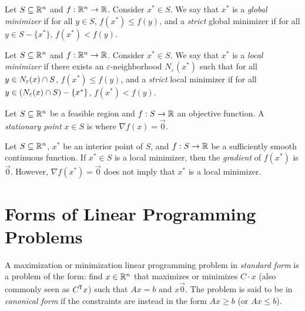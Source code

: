\begin{defn}
    Let $S \subseteq \mathbb{R}^n$ and $f: \mathbb{R}^n \to \mathbb{R}$. Consider $x^* \in S$. We say that $x^*$ is a \emph{global minimizer} if for all $y \in S$, $f(x^*) \leq f(y)$, and a \emph{strict} global minimizer if for all $y \in S - \{x^*\}$, $f(x^*) < f(y)$.
\end{defn}

\begin{defn}
    Let $S \subseteq \mathbb{R}^n$ and $f: \mathbb{R}^n \to \mathbb{R}$. Consider $x^* \in S$. We say that $x^*$ is a \emph{local minimizer} if there exists an $\varepsilon$-neighborhood $N_{\varepsilon}(x^*)$ such that for all $y \in N_{\varepsilon}(x) \cap S$, $f(x^*) \leq f(y)$, and a \emph{strict} local minimizer if for all $y \in \left(N_{\varepsilon}(x) \cap S\right) - \{x^*\}$, $f(x^*) < f(y)$.
\end{defn}

\begin{defn}
    Let $S \subseteq \mathbb{R}^n$ be a feasible region and $f: S \to \mathbb{R}$ an objective function. A \emph{stationary point} $x \in S$ is where $\nabla f(x) = \vec{0}.$
\end{defn}

\begin{rmk}
    Let $S \subseteq \mathbb{R}^n$, $x^*$ be an interior point of $S$, and $f: S \to \mathbb{R}$ be a sufficiently smooth continuous function. If $x^* \in S$ is a local minimizer, then the \emph{gradient} of $f(x^*)$ is $\vec{0}$. However, $\nabla f(x^*) = \vec{0}$ does not imply that $x^*$ is a local minimizer.
\end{rmk}

\section{Forms of Linear Programming Problems}

\begin{defn}
    A maximization or minimization linear programming problem in \emph{standard form} is a problem of the form:
    find $x \in \mathbb{R}^n$ that maximizes or minimizes $C \cdot x$ (also commonly seen as $C^{\mkern-1.5mu\mathsf{T}}x$) such that $Ax = b$ and $x \vec{0}$. The problem is said to be in \emph{canonical form} if the constraints are instead in the form $Ax \geq b$ (or $Ax \leq b$).
\end{defn}

